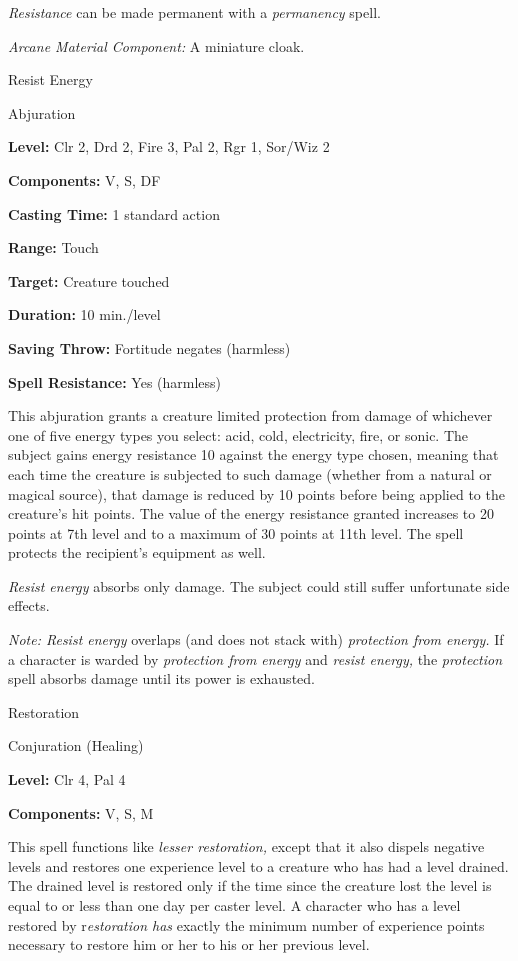 \documentclass{article}
\begin{document}
\textit{Resistance }can be made permanent with a \textit{permanency }spell.

\textit{Arcane Material Component: }A miniature cloak.

\vspace{12pt}
Resist Energy

Abjuration

\textbf{Level:} Clr 2, Drd 2, Fire 3, Pal 2, Rgr 1, Sor/Wiz 2

\textbf{Components:} V, S, DF

\textbf{Casting Time:} 1 standard action

\textbf{Range:} Touch

\textbf{Target:} Creature touched

\textbf{Duration:} 10 min./level

\textbf{Saving Throw:} Fortitude negates (harmless)

\textbf{Spell Resistance:} Yes (harmless)

This abjuration grants a creature limited protection from damage of whichever one 
of five energy types you select: acid, cold, electricity, fire, or sonic. The subject 
gains energy resistance 10 against the energy type chosen, meaning that each time 
the creature is subjected to such damage (whether from a natural or magical source), 
that damage is reduced by 10 points before being applied to the creature's hit 
points. The value of the energy resistance granted increases to 20 points at 7th 
level and to a maximum of 30 points at 11th level. The spell protects the recipient's 
equipment as well.

\textit{Resist energy }absorbs only damage. The subject could still suffer unfortunate 
side effects.

\textit{Note: Resist energy }overlaps (and does not stack with) \textit{protection 
from energy. }If a character is warded by \textit{protection from energy }and \textit{resist 
energy, }the \textit{protection }spell absorbs damage until its power is exhausted.

\vspace{12pt}
Restoration

Conjuration (Healing)

\textbf{Level:} Clr 4, Pal 4

\textbf{Components:} V, S, M

This spell functions like \textit{lesser restoration, }except that it also dispels 
negative levels and restores one experience level to a creature who has had a level 
drained. The drained level is restored only if the time since the creature lost 
the level is equal to or less than one day per caster level. A character who has 
a level restored by r\textit{estoration has }exactly the minimum number of experience 
points necessary to restore him or her to his or her previous level.
\end{document}
